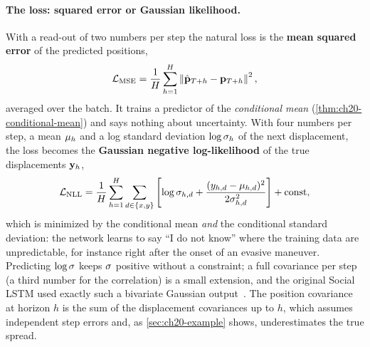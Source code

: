 \paragraph{The loss: squared error or Gaussian likelihood.}
%
With a read-out of two numbers per step the natural loss is the \textbf{mean
squared error} of the predicted positions,
\begin{equation}
  \mathcal{L}_{\mathrm{MSE}} = \frac{1}{H}\sum_{h=1}^{H} \left\lVert \hat{\mathbf{p}}_{T+h} - \mathbf{p}_{T+h} \right\rVert^2,
  \label{eq:ch20-mse}
\end{equation}
averaged over the batch. It trains a predictor of the \emph{conditional
mean} (\cref{thm:ch20-conditional-mean}) and says nothing about uncertainty.
With four numbers per step, a mean $\mathbf{\mu}_h$ and a log standard deviation
$\log\mathbf{\sigma}_h$ of the next displacement, the loss becomes the
\textbf{Gaussian negative log-likelihood} of the true displacements
$\mathbf{y}_h$,
\begin{equation}
  \mathcal{L}_{\mathrm{NLL}} = \frac{1}{H}\sum_{h=1}^{H}\sum_{d \in \left\{ x, y \right\}}
  \left[ \log\sigma_{h,d} + \frac{(y_{h,d} - \mu_{h,d})^2}{2\sigma_{h,d}^2} \right] + \text{const},
  \label{eq:ch20-nll}
\end{equation}
which is minimized by the conditional mean \emph{and} the conditional
standard deviation: the network learns to say ``I do not know'' where the
training data are unpredictable, for instance right after the onset of an
evasive maneuver. Predicting $\log\mathbf{\sigma}$ keeps $\mathbf{\sigma}$
positive without a constraint; a full covariance per step (a third number
for the correlation) is a small extension, and the original Social LSTM used
exactly such a bivariate Gaussian output~\cite{alahi2016social}. The position
covariance at horizon $h$ is the sum of the displacement covariances up to
$h$, which assumes independent step errors and, as \cref{sec:ch20-example}
shows, underestimates the true spread.

